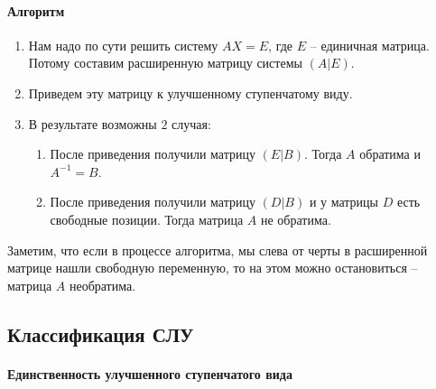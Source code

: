 \paragraph{Алгоритм} 
\begin{enumerate}
\item Нам надо по сути решить систему $AX = E$, где $E$ -- единичная матрица. Потому составим расширенную матрицу системы $(A|E)$.

\item Приведем эту матрицу к улучшенному ступенчатому виду.

\item В результате возможны $2$ случая:
\begin{enumerate}
\item После приведения получили матрицу $(E|B)$. Тогда $A$ обратима и $A^{-1} = B$. 
\item После приведения получили матрицу $(D|B)$ и у матрицы $D$ есть свободные позиции. Тогда матрица $A$ не обратима.
\end{enumerate}
\end{enumerate}
Заметим, что если в процессе алгоритма, мы слева от черты в расширенной матрице нашли свободную переменную, то на этом можно остановиться -- матрица $A$ необратима.


\subsection{Классификация СЛУ}

\paragraph{Единственность улучшенного ступенчатого вида}


